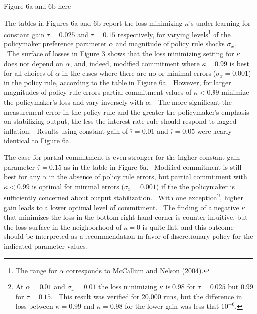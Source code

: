 \documentclass{article}
\begin{document}
\begin{doublespace}
\begin{center}
Figure 6a and 6b here
\end{center}

The tables in Figures 6a and 6b report the loss minimizing $\kappa $'s under
learning for constant gain $\bar{\tau}=0.025$ and $\bar{\tau}=0.15$
respectively, for varying levels\footnote{%
The range for $\alpha $ corresponds to McCallum and Nelson (2004).} of the
policymaker preference parameter $\alpha $ and magnitude of policy rule
shocks $\sigma _{x}$. \ The surface of losses in Figure 3 shows that the
loss minimizing setting for $\kappa $ does not depend on $\alpha $, and,
indeed, modified commitment where $\kappa =0.99$ is best for all choices of $%
\alpha $ in the cases where there are no or minimal errors ($\sigma 
_{x}=0.001$) in the policy rule, according to the table in Figure 6a. \
However, for larger magnitudes of policy rule errors partial commitment
values of $\kappa <0.99$ minimize the policymaker's loss and vary inversely
with $\alpha $. \ The more significant the measurement error in the policy
rule and the greater the policymaker's emphasis on stabilizing output, the
less the interest rate rule should respond to lagged inflation. \ Results
using constant gain of $\bar{\tau}=0.01$ and $\bar{\tau}=0.05$ were nearly
identical to Figure 6a.

The case for partial commitment is even stronger for the higher constant
gain parameter $\bar{\tau}=0.15$ as in the table in Figure 6a. \ Modified
commitment is still best for any $\alpha $ in the absence of policy rule
errors, but partial commitment with $\kappa <0.99$ is optimal for minimal
errors ($\sigma _{x}=0.001$) if the the policymaker is sufficiently
concerned about output stabilization. \ With one exception\footnote{%
At $\alpha =0.01$ and $\sigma _{x}=0.01$ the loss minimizing $\kappa $ is
0.98 for $\bar{\tau}=0.025$ but 0.99 for $\bar{\tau}=0.15$. \ This result
was verified for 20,000 runs, but the difference in loss between $\kappa 
=0.99$ and $\kappa =0.98$ for the lower gain was less that $10^{-6}.$},
higher gain leads to a lower optimal level of commitment. \ The finding of a
negative $\kappa $ that minimizes the loss in the bottom right hand corner
is counter-intuitive, but the loss surface in the neighborhood of $\kappa =0$
is quite flat, and this outcome should be interpreted as a recommendation in
favor of discretionary policy for the indicated parameter values.


\end{doublespace}
\end{document}
